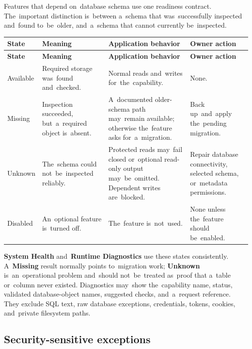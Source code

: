 \documentclass[11pt,a4paper]{article}
\newcommand{\ui}[1]{\textbf{#1}}
\begin{document}
Features that depend on~database schema use one readiness contract.
The~important distinction is~between a~schema that was~successfully inspected
and~found to~be~older, and~a~schema that cannot currently be~inspected.

\begin{longtable}{%
    >{\raggedright\arraybackslash}p{}%
    >{\raggedright\arraybackslash}p{}%
    >{\raggedright\arraybackslash}p{}%
    >{\raggedright\arraybackslash}p{}%
}
\toprule
\textbf{State} & \textbf{Meaning} & \textbf{Application behavior} &
\textbf{Owner action}\\
\midrule
\endfirsthead
\toprule
\textbf{State} & \textbf{Meaning} & \textbf{Application behavior} &
\textbf{Owner action}\\
\midrule
\endhead
Available & Required storage was~found and~checked. & Normal reads and~writes
for~the~capability. & None.\\
Missing & Inspection succeeded, but~a~required object is~absent. & A~documented
older-schema path may~remain available; otherwise the~feature asks
for~a~migration. & Back up~and~apply the~pending migration.\\
Unknown & The~schema could not~be~inspected reliably. & Protected reads may~fail
closed or~optional read-only output may~be~omitted. Dependent writes
are~blocked. & Repair database connectivity, selected schema, or~metadata
permissions.\\
Disabled & An~optional feature is~turned off. & The~feature is~not~used. & None
unless the~feature should be~enabled.\\
\bottomrule
\end{longtable}

\ui{System Health} and~\ui{Runtime Diagnostics} use these states consistently.
A~\ui{Missing} result normally points to~migration work; \ui{Unknown}
is~an~operational problem and~should not~be~treated as~proof that a~table
or~column never existed. Diagnostics may~show the~capability name, status,
validated database-object names, suggested checks, and~a~request reference. They
exclude SQL text, raw database exceptions, credentials, tokens, cookies,
and~private filesystem paths.

\subsection{Security-sensitive exceptions}
\end{document}
